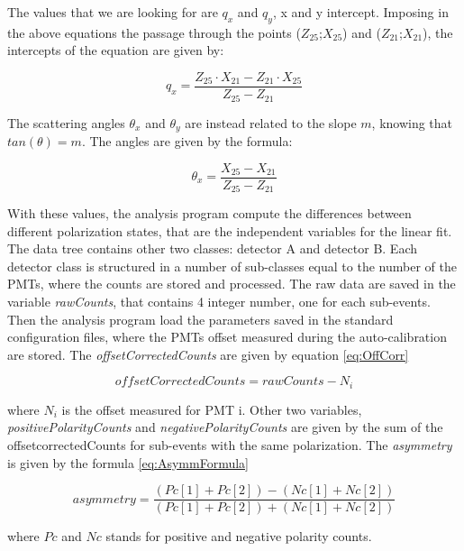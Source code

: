 The values that we are looking for are $q_{x}$ and $q_{y}$, x and y intercept. 
Imposing in the above equations the passage through the points ($Z_{25}$;$X_{25}$) and ($Z_{21}$;$X_{21}$), the intercepts of the equation are given by:

\begin{equation}
q_{x} = \dfrac{Z_{25} \cdot X_{21} - Z_{21} \cdot X_{25}}{Z_{25} - Z_{21}}
\end{equation} 

The scattering angles $\theta_{x}$ and $\theta_{y}$ are instead related to the slope $m$, knowing that $tan(\theta) = m$. The angles are given by the formula:

\begin{equation}
\theta_{x} = \dfrac{X_{25} - X_{21}}{Z_{25} - Z_{21}}
\end{equation}

With these values, the analysis program compute the differences between different polarization states, that are the independent variables for the linear fit. 
The data tree contains other two classes: detector A and detector B. Each detector class is structured in a number of sub-classes equal to the number of the PMTs, where the counts are stored and processed. The raw data are saved in the variable \textit{rawCounts}, that contains 4 integer number, one for each sub-events. Then the analysis program load the parameters saved in the standard configuration files, where the PMTs offset measured during the auto-calibration are stored. The \textit{offsetCorrectedCounts} are given by equation \ref{eq:OffCorr}

\begin{equation} \label{eq:OffCorr}
offsetCorrectedCounts = rawCounts - N_{i}
\end{equation} 

where $N_{i}$ is the offset measured for PMT i. Other two variables, \textit{positivePolarityCounts} and \textit{negativePolarityCounts} are given by the sum of the offsetcorrectedCounts for sub-events with the same polarization. The \textit{asymmetry} is given by the formula \ref{eq:AsymmFormula}

\begin{equation} \label{eq:AsymmFormula}
asymmetry = \dfrac{(Pc[1] + Pc[2]) - (Nc[1] + Nc[2])}{(Pc[1] + Pc[2]) + (Nc[1] + Nc[2])}
\end{equation}

where $Pc$ and $Nc$ stands for positive and negative polarity counts. 
